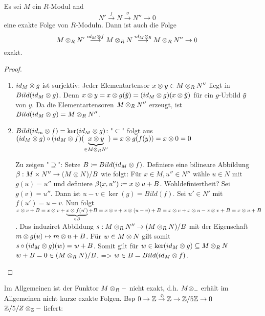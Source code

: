 \documentclass[../main.tex]{subfiles}
\begin{document}
\begin{theorem}
    Es sei $M$ ein $R$-Modul and $$N'\overset{f}{\longrightarrow} N \overset{g}{\longrightarrow} N'' \rightarrow 0$$ eine exakte Folge von $R$-Moduln.
    Dann ist auch die Folge $$M\otimes_R N'\overset{id_M\otimes f}{\longrightarrow} M\otimes_R N \overset{id_M\otimes g}{\longrightarrow} M\otimes_R N'' \rightarrow 0$$ exakt.
\end{theorem}
\begin{proof}
    \begin{enumerate}
        \item $id_M\otimes g$ ist surjektiv:
        Jeder Elementartensor $x\otimes y\in M\otimes_R N''$ liegt in $Bild(id_M\otimes g)$. Denn $x\otimes y = x\otimes g(\Tilde{y}) = (id_M\otimes g) (x\otimes \Tilde{y})$ für ein $g$-Urbild $\Tilde{y}$ von $y$.
        Da die Elementartensoren $M\otimes_R N''$ erzeugt, ist $Bild(id_M \otimes g) = M\otimes_R N''$.
        \item $Bild(id_m\otimes f) =\ker(id_M \otimes g)$:
        "$\subseteq$" folgt aus $(id_M\otimes g)\circ (id_M\otimes f) (\underbrace{x\otimes y}_{\in M\otimes_R N'}) = x\otimes g(f(y)) = x\otimes 0 = 0$
        
        Zu zeigen "$\supseteq$":
        Setze $B\coloneqq Bild(id_M\otimes f)$.
        Definiere eine bilineare Abbildung $\beta: M\times N'' \rightarrow (M\otimes N)/B$ wie folgt:
        Für $x\in M, u'' \in N''$ wähle $u\in N$ mit $g(u) = u''$ und definiere $\beta(x,u'')\coloneqq x\otimes u + B$.
        Wohldefiniertheit? Sei $g(v) = u''$. Dann ist $u-v \in \ker(g) = Bild(f)$. Sei $u'\in N'$ mit $f(u') = u-v$. Nun folgt $x\otimes v +B = x\otimes v + \underbrace{x\otimes f(u')}_{\in B} +B = x\otimes v + x\otimes (u-v) +B = x\otimes v + x\otimes u - x\otimes v + B = x\otimes u +B$.
        Das induziret Abbildung $s:M\otimes_R N'' \rightarrow (M\otimes_R N)/B$ mit der Eigenschaft $m\otimes g(u)\mapsto m\otimes u +B$.
        Für $w\in M\otimes N$ gilt somit $s\circ(id_M\otimes g)(w) = w+B$.
        Somit gilt für $w\in \ker(id_M\otimes g)\subseteq M\otimes_R N$ $w+B=0\in (M\otimes_R N)/B$.
        => $w\in B = Bild(id_M\otimes f)$.
    \end{enumerate}
\end{proof}
\begin{remark}
    Im Allgemeinen ist der Funktor $M\otimes_R -$ nicht exakt, d.h. $M\otimes_-$ erhält im Allgemeinen nicht kurze exakte Folgen.
    Bsp $0\rightarrow\mathbb{Z}\overset{\cdot 5}{\rightarrow} \mathbb{Z}\rightarrow\mathbb{Z}/5\mathbb{Z}\rightarrow 0$
    $\mathbb{Z}/5/Z\otimes_{\mathbb{Z}} -$ liefert:
    \TODO[bild]
\end{remark}
\end{document}
